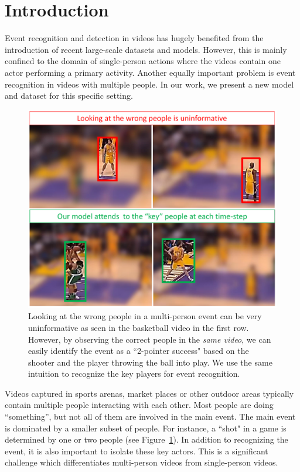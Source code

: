 \section{Introduction}

Event recognition and detection in videos has hugely benefited from the
introduction of recent large-scale datasets
\cite{THUMOS,UCF101,Karpathy_CVPR14,MED11,ActivityNet} and models.  However, this is mainly
confined to the domain of single-person actions where the videos contain one
actor performing a primary activity.  Another equally important problem is
event recognition in videos with multiple people. In our work, we present a new
model and dataset for this specific setting.

\begin{figure}[ht!]
  \vspace{-4mm}
\begin{center}
  \includegraphics[width=3.2 in]{images/pull_figure_v3_cropped.pdf}
\end{center}
\caption{Looking at the wrong people in a multi-person event can be very uninformative
  as seen in the basketball video in the first row. However, by observing the correct
  people in the \emph{same video}, we can easily identify the event as a ``2-pointer success" based
  on the shooter and the player throwing the ball into play. We use the same intuition
to recognize the key players for event recognition.}
\vspace{-4mm}
\label{fig:pull_figure}
\end{figure}

Videos captured in sports arenas, market places or other outdoor areas
typically contain multiple people interacting with each other.
Most people are doing ``something'', but not all of them are involved in the main event.
The main event is dominated by a smaller subset of people. For instance, a ``shot" in a game
is determined by one or two people (see Figure~\ref{fig:pull_figure}).
In addition to recognizing the event, it is also important
to isolate these key actors. This is a significant challenge which
differentiates multi-person videos from single-person videos.

